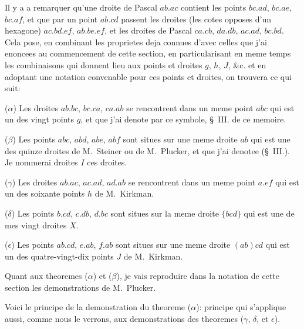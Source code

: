 \documentclass[11pt,a4paper]{book}
\begin{document}
Il y a a remarquer qu'une droite de Pascal $ab.ac$ contient les points $bc.ad$, $bc.ae$, $bc.af$, et que par un point $ab.cd$ passent les droites (les cotes opposes d'un hexagone) $ac.bd.ef$, $ab.be.ef$, et les droites de Pascal $ca.cb$, $da.db$, $ac.ad$, $bc.bd$. Cela pose, en combinant les proprietes deja connues d'avec celles que j'ai enoncees au commencement de cette section, en particularisant en meme temps les combinaisons qui donnent lieu aux points et droites $g$, $h$, $J$, \&c. et en adoptant une notation convenable pour ces points et droites, on trouvera ce qui suit:

($\alpha$) Les droites $ab.bc$, $bc.ca$, $ca.ab$ se rencontrent dans un meme point $abc$ qui est un des vingt points $g$, et que j'ai denote par ce symbole, \S~III. de ce memoire.

($\beta$) Les points $abc$, $abd$, $abe$, $abf$ sont situes sur une meme droite $ab$ qui est une des quinze droites de M.~Steiner ou de M.~Plucker, et que j'ai denotee (\S~III.). Je nommerai droites $I$ ces droites.

($\gamma$) Les droites $ab.ac$, $ac.ad$, $ad.ab$ se rencontrent dans un meme point $a.ef$ qui est un des soixante points $h$ de M.~Kirkman.

($\delta$) Les points $b.cd$, $c.db$, $d.bc$ sont situes sur la meme droite $\{bcd\}$ qui est une de mes vingt droites $X$.

($\epsilon$) Les points $ab.cd$, $e.ab$, $f.ab$ sont situes sur une meme droite $(ab)cd$ qui est un des quatre-vingt-dix points $J$ de M.~Kirkman.

Quant aux theoremes ($\alpha$) et ($\beta$), je vais reproduire dans la notation de cette section les demonstrations de M.~Plucker.

Voici le principe de la demonstration du theoreme ($\alpha$): principe qui s'applique aussi, comme nous le verrons, aux demonstrations des theoremes ($\gamma$, $\delta$, et $\epsilon$).
\end{document}
